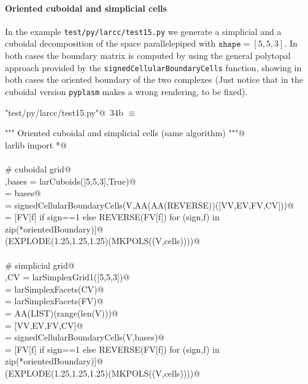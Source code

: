 \documentclass[11pt,oneside]{article}    %
\begin{document}
\paragraph{Oriented cuboidal and simplicial cells}
In the example \texttt{test/py/larcc/test15.py} we generate a simplicial and a cuboidal decomposition of the space parallelepiped with $\texttt{shape}=[5,5,3]$.
In both cases the boundary matrix is computed by using the general polytopal approach provided by the \texttt{signedCellularBoundaryCells} function, showing in both cases the oriented boundary of the two complexes
(Just notice that in the cuboidal version \texttt{pyplasm} makes a wrong rendering, to be fixed).

\begin{flushleft} \small \label{scrap56}
\protect{}\verb@"test/py/larcc/test15.py"@\nobreak\ {\footnotesize 34b }$\equiv$
\vspace{-1ex}
\begin{list}{}{} \item
\mbox{}\verb@""" Oriented cuboidal and simplicial cells (same algorithm) """@\\
\mbox{}\verb@from larlib import *@\\
\mbox{}\verb@@\\
\mbox{}\verb@# cuboidal grid@\\
\mbox{}\verb@V,bases = larCuboids([5,5,3],True)@\\
\mbox{}\verb@[VV,EV,FV,CV] = bases@\\
\mbox{}\verb@orientedBoundary = signedCellularBoundaryCells(V,AA(AA(REVERSE))([VV,EV,FV,CV]))@\\
\mbox{}\verb@cells = [FV[f] if sign==1 else REVERSE(FV[f])  for (sign,f) in zip(*orientedBoundary)]@\\
\mbox{}\verb@VIEW(EXPLODE(1.25,1.25,1.25)(MKPOLS((V,cells))))@\\
\mbox{}\verb@@\\
\mbox{}\verb@# simplicial grid@\\
\mbox{}\verb@V,CV = larSimplexGrid1([5,5,3])@\\
\mbox{}\verb@FV = larSimplexFacets(CV)@\\
\mbox{}\verb@EV = larSimplexFacets(FV)@\\
\mbox{}\verb@VV = AA(LIST)(range(len(V)))@\\
\mbox{}\verb@bases = [VV,EV,FV,CV]@\\
\mbox{}\verb@orientedBoundary = signedCellularBoundaryCells(V,bases)@\\
\mbox{}\verb@cells = [FV[f] if sign==1 else REVERSE(FV[f])  for (sign,f) in zip(*orientedBoundary)]@\\
\mbox{}\verb@VIEW(EXPLODE(1.25,1.25,1.25)(MKPOLS((V,cells))))@\\
\mbox{}\verb@@{\NWsep}
\end{list}
\vspace{-2ex}
\end{flushleft}
\end{document}

